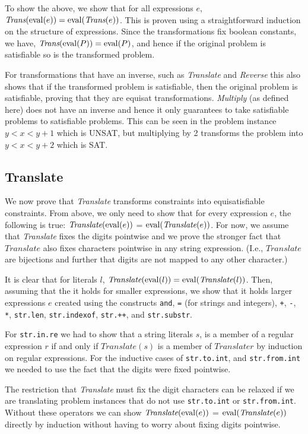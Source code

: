 To show the above, we show that for all expressions $e$,
$\textit{Trans}(\operatorname{eval} (e)) = \operatorname{eval} (\textit{Trans}(e))$. This is
proven using a straightforward induction on the structure of
expressions. Since the transformations fix boolean constants, we have,
$\textit{Trans}(\operatorname{eval} (P)) = \operatorname{eval} (P)$, and hence if the original
problem is satisfiable so is the transformed problem.

For transformations that have an inverse, such as \textit{Translate}
and \textit{Reverse} this also shows that if the transformed problem
is satisfiable, then the original problem is satisfiable, proving that
they are equisat transformations. \textit{Multiply} (as defined here)
does not have an inverse and hence it only guarantees to take
satisfiable problems to satisfiable problems. This can be seen in the
problem instance $y<x<y+1$ which is UNSAT, but multiplying by 2
transforms the problem into $y<x<y+2$ which is SAT.

\subsection{Translate}
We now prove that \textit{Translate} transforms constraints into
equisatisfiable constraints. From above, we only need to show that for
every expression $e$, the following is true: $\textit{Translate}(\operatorname{eval}
(e))$ = $\operatorname{eval} (\textit{Translate}(e))$. For now, we assume that
\textit{Translate} fixes the digits pointwise and we prove the
stronger fact that $\textit{Translate}$ also fixes characters
pointwise in any string expression. (I.e., $\textit{Translate}$ are
bijections and further that digits are not mapped to any other
character.)

It is clear that for literals $l$, $\textit{Translate}(\operatorname{eval} (l)) =
\operatorname{eval} (\textit{Translate}(l))$. Then, assuming that the it holds for
smaller expressions, we show that it holds larger expressions $e$
created using the constructs \texttt{and}, \texttt{=} (for strings and
integers), \texttt{+}, \texttt{-}, \texttt{*}, \texttt{str.len},
\texttt{str.indexof}, \texttt{str.++}, and \texttt{str.substr}.

For \texttt{str.in.re} we had to show that a string literals $s$, is a
member of a regular expression $r$ if and only if
$\textit{Translate}(s)$ is a member of $\textit{Translate}{r}$ by
induction on regular expressions. For the inductive cases of
\texttt{str.to.int}, and \texttt{str.from.int} we needed to use the
fact that the digits were fixed pointwise.

The restriction that \textit{Translate} must fix the digit characters
can be relaxed if we are translating problem instances that do not use
\texttt{str.to.int} or \texttt{str.from.int}. Without these operators
we can show $\textit{Translate}(\operatorname{eval} (e))$ = $\operatorname{eval}
(\textit{Translate}(e))$ directly by induction without having to worry
about fixing digits pointwise.

